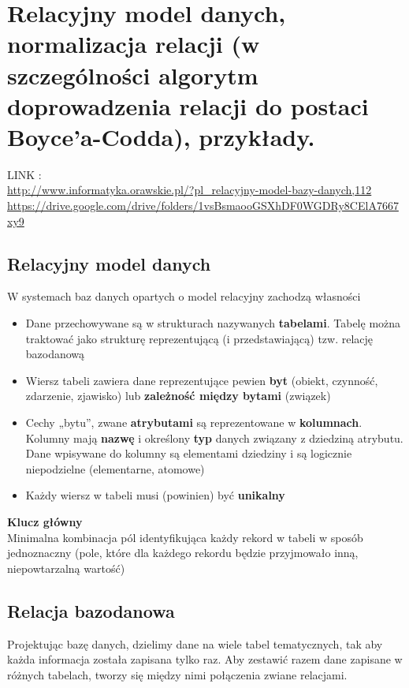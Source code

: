 \documentclass[main.tex]{subfiles}
\begin{document}
    \section{Relacyjny model danych, normalizacja relacji (w szczególności algorytm doprowadzenia relacji do postaci Boyce’a-Codda), przykłady.}

    LINK :\\
    \url{http://www.informatyka.orawskie.pl/?pl_relacyjny-model-bazy-danych,112}
    \url{https://drive.google.com/drive/folders/1vsBsmaooGSXhDF0WGDRy8CElA7667xy9}

    \subsection{Relacyjny model danych}

    W systemach baz danych opartych o model relacyjny zachodzą własności
    \begin{itemize}
        \item Dane przechowywane są w strukturach nazywanych \textbf{tabelami}. Tabelę można traktować jako strukturę reprezentującą (i przedstawiającą) tzw. relację bazodanową
        \item Wiersz tabeli zawiera dane reprezentujące pewien \textbf{byt} (obiekt, czynność, zdarzenie, zjawisko) lub \textbf{zależność między bytami} (związek)
        \item Cechy „bytu”, zwane \textbf{atrybutami} są reprezentowane w \textbf{kolumnach}. Kolumny mają \textbf{nazwę} i określony \textbf{typ} danych związany z dziedziną atrybutu. Dane wpisywane do kolumny są elementami dziedziny i są logicznie niepodzielne (elementarne, atomowe)
        \item Każdy wiersz w tabeli musi (powinien) być \textbf{unikalny}
    \end{itemize}

    \begin{definition}
        \textbf{Klucz główny}\\
        Minimalna kombinacja pól identyfikująca każdy rekord w tabeli w sposób jednoznaczny (pole, które dla każdego rekordu będzie przyjmowało inną, niepowtarzalną wartość)
    \end{definition}

    \subsection{Relacja bazodanowa}
    Projektując bazę danych, dzielimy dane na wiele tabel tematycznych, tak aby każda informacja została zapisana tylko raz. Aby zestawić razem dane zapisane w różnych tabelach, tworzy się między nimi połączenia zwiane relacjami.
\end{document}
